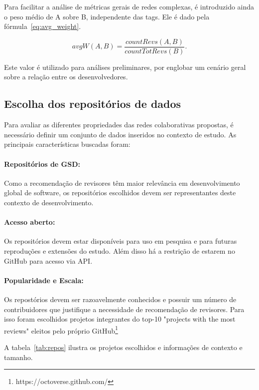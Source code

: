 \documentclass[sigconf]{acmart}
\begin{document}
Para facilitar a análise de métricas gerais de redes complexas, é introduzido ainda o peso médio de A sobre B, independente das tags. Ele é dado pela fórmula~\ref{eq:avg_weight}.


\begin{equation}\label{eq:avg_weight}
	avgW(A,B) = \dfrac{countRevs(A,B)}{countTotRevs(B)}.
\end{equation}

Este valor é utilizado para análises preliminares, por englobar um cenário geral sobre a relação entre os desenvolvedores.



\subsection{Escolha dos repositórios de dados}

Para avaliar as diferentes propriedades das redes colaborativas propostas, é necessário definir um conjunto de dados inseridos no contexto de estudo. As principais características buscadas foram:

\paragraph{Repositórios de GSD:} Como a recomendação de revisores têm maior relevância em desenvolvimento global de software, os repositórios escolhidos devem ser representantes deste contexto de desenvolvimento.

\paragraph{Acesso aberto: } Os repositórios devem estar disponíveis para uso em pesquisa e para futuras reproduções e extensões do estudo. Além disso há a restrição de estarem no GitHub para acesso via API.

\paragraph{Popularidade e Escala:} Os repostórios devem ser razoavelmente conhecidos e possuir um número de contribuidores que justifique a necessidade de recomendação de revisores. Para isso foram escolhidos projetos integrantes do top-10 "projects with the most reviews" eleitos pelo próprio GitHub\footnote{https://octoverse.github.com/}

A tabela~\ref{tab:repos} ilustra os projetos escolhidos e informações de contexto e tamanho.
\end{document}
